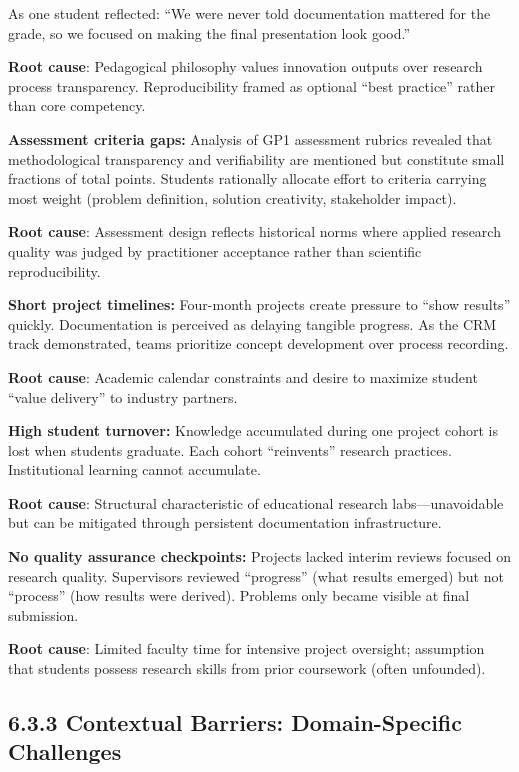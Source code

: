 \documentclass[
  oneside,
  open=any]{scrbook}
\begin{document}
As one student reflected: ``We were never told documentation mattered
for the grade, so we focused on making the final presentation look
good.''

\textbf{Root cause}: Pedagogical philosophy values innovation outputs
over research process transparency. Reproducibility framed as optional
``best practice'' rather than core competency.

\textbf{Assessment criteria gaps:} Analysis of GP1 assessment rubrics
revealed that methodological transparency and verifiability are
mentioned but constitute small fractions of total points. Students
rationally allocate effort to criteria carrying most weight (problem
definition, solution creativity, stakeholder impact).

\textbf{Root cause}: Assessment design reflects historical norms where
applied research quality was judged by practitioner acceptance rather
than scientific reproducibility.

\textbf{Short project timelines:} Four-month projects create pressure to
``show results'' quickly. Documentation is perceived as delaying
tangible progress. As the CRM track demonstrated, teams prioritize
concept development over process recording.

\textbf{Root cause}: Academic calendar constraints and desire to
maximize student ``value delivery'' to industry partners.

\textbf{High student turnover:} Knowledge accumulated during one project
cohort is lost when students graduate. Each cohort ``reinvents''
research practices. Institutional learning cannot accumulate.

\textbf{Root cause}: Structural characteristic of educational research
labs---unavoidable but can be mitigated through persistent documentation
infrastructure.

\textbf{No quality assurance checkpoints:} Projects lacked interim
reviews focused on research quality. Supervisors reviewed ``progress''
(what results emerged) but not ``process'' (how results were derived).
Problems only became visible at final submission.

\textbf{Root cause}: Limited faculty time for intensive project
oversight; assumption that students possess research skills from prior
coursework (often unfounded).

\subsection{6.3.3 Contextual Barriers: Domain-Specific
Challenges}\label{contextual-barriers-domain-specific-challenges}
\end{document}
